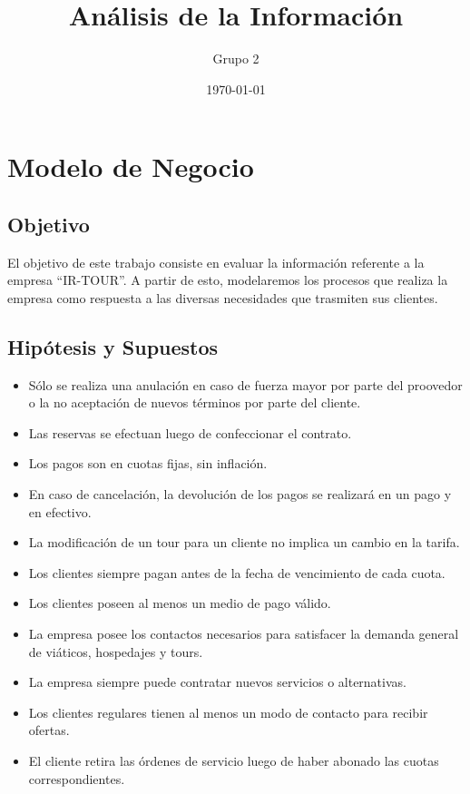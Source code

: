 \documentclass[12pt,a4paper]{article}
\title{Análisis de la Información}
\author{
        Grupo 2
}
\date{\today}
\begin{document}
%


\maketitle\thispagestyle{empty}

\newpage\null\thispagestyle{empty}\newpage

\newpage
\tableofcontents

\newpage\null\thispagestyle{empty}\newpage

\section{Modelo de Negocio}
	\subsection{Objetivo}
		El objetivo de este trabajo consiste en evaluar la información referente a la empresa “IR-TOUR”. A partir de esto, modelaremos los procesos que realiza la empresa como respuesta a las diversas necesidades que trasmiten sus clientes.  

	\subsection{Hipótesis y Supuestos}
		\begin{itemize}
			\item Sólo se realiza una anulación en caso de fuerza mayor por parte del proovedor o la no aceptación de nuevos términos por parte del cliente.
			\item Las reservas se efectuan luego de confeccionar el contrato.
			\item Los pagos son en cuotas fijas, sin inflación.
			\item En caso de cancelación, la devolución de los pagos se realizará en un pago y en efectivo.
			\item La modificación de un tour para un cliente no implica un cambio en la tarifa.
			\item Los clientes siempre pagan antes de la fecha de vencimiento de cada cuota.
			\item Los clientes poseen al menos un medio de pago válido.
			\item La empresa posee los contactos necesarios para satisfacer la demanda general de viáticos, hospedajes y tours.
			\item La empresa siempre puede contratar nuevos servicios o alternativas.
			\item Los clientes regulares tienen al menos un modo de contacto para recibir ofertas.
			\item El cliente retira las órdenes de servicio luego de haber abonado las cuotas correspondientes.
		\end{itemize}
\end{document}
